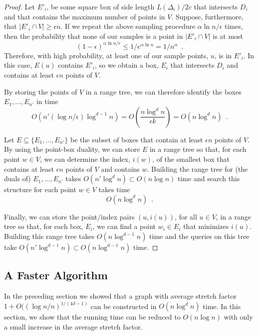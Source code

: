 \documentclass{patmorin}
\begin{document}
\begin{proof}
  Let $E'_i$, be some square box of side length $L(\Delta_i)/2c$ that
  intersects $D_i$ and that contains the maximum number of points in $V$.
  Suppose, furthermore, that $|E'_i\cap V|\ge \epsilon n$.  If we repeat
  the above sampling procedure $\alpha\ln n/\epsilon$ times, then the
  probability that none of our samples is a point in $|E'_i\cap V|$ is
  at most
  \[
      (1-\epsilon)^{\alpha\ln n/\epsilon} 
         \le 1/e^{\alpha\ln n} = 1/n^{\alpha} \enspace .
  \]
  Therefore, with high probability, at least one of our sample points,
  $u$, is in $E'_i$.  In this case, $E(u)$ contains $E'_i$, so we obtain
  a box, $E_i$ that intersects $D_i$ and contains at least $\epsilon n$
  points of $V$.

  By storing the points of $V$ in a range tree, we can therefore identify
  the boxes $E_1,\ldots,E_{n'}$ in time
  \[
     O(n'(\log n/\epsilon)\log^{d-1} n) 
        = O\left(\frac{n\log^{d}n}{\epsilon k} \right) = O(n\log^d n) \enspace .
  \]

  Let $E\subseteq\{E_1,\ldots,E_{n'}\}$ be the subset of boxes that
  contain at least $\epsilon n$ points of $V$. By using the point-box
  duality, we can store $E$ in a range tree so that, for each point
  $w\in V$, we can determine the index, $i(w)$, of the smallest box
  that contains at least $\epsilon n$ points of $V$ and contains $w$.
  Building the range tree for (the duals of) $E_1,\ldots,E_{n'}$ takes
  $O(n'\log^d n)\subset O(n\log n)$ time and search this structure for
  each point $w\in V$ takes time
  \[
     O(n\log^d n) \enspace .
  \]

  Finally, we can store the point/index pairs $(u,i(u))$, for all
  $u\in V$, in a range tree so that, for each box, $E_i$, we can find
  a point $w_i\in E_i$ that minimizes $i(u)$.  Building this range
  tree takes $O(n\log^{d-1} n)$ time and the queries on this tree take
  $O(n'\log^{d-1} n)\subset O(n\log^{d-1} n)$ time.
\end{proof}

\subsection{A Faster Algorithm}

In the preceding section we showed that a graph with average stretch factor
$1+O((\log n/n)^{1/(4d-1)}$ can be constructed in $O(n\log^d n)$ time. In
this section, we show that the running time can be reduced to $O(n\log n)$
with only a small increase in the average stretch factor.
\end{document}
